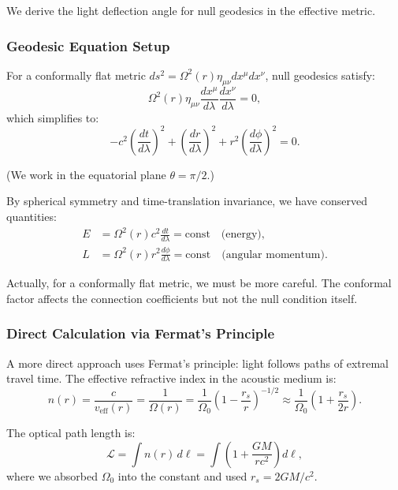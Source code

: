 \documentclass[11pt,a4paper]{article}
\theoremstyle{definition}
\theoremstyle{remark}
\begin{document}
We derive the light deflection angle for null geodesics in the effective metric.

\subsubsection{Geodesic Equation Setup}

For a conformally flat metric $ds^2 = \Omega^2(r) \eta_{\mu\nu} dx^\mu dx^\nu$, null geodesics satisfy:
\begin{equation}
\Omega^2(r) \eta_{\mu\nu} \frac{dx^\mu}{d\lambda} \frac{dx^\nu}{d\lambda} = 0,
\end{equation}
which simplifies to:
\begin{equation}
-c^2 \left(\frac{dt}{d\lambda}\right)^2 + \left(\frac{dr}{d\lambda}\right)^2 + r^2 \left(\frac{d\phi}{d\lambda}\right)^2 = 0.
\end{equation}

(We work in the equatorial plane $\theta = \pi/2$.)

By spherical symmetry and time-translation invariance, we have conserved quantities:
\begin{align}
E &= \Omega^2(r) c^2 \frac{dt}{d\lambda} = \text{const} \quad \text{(energy)}, \\
L &= \Omega^2(r) r^2 \frac{d\phi}{d\lambda} = \text{const} \quad \text{(angular momentum)}.
\end{align}

Actually, for a conformally flat metric, we must be more careful. The conformal factor affects the connection coefficients but not the null condition itself.

\subsubsection{Direct Calculation via Fermat's Principle}

A more direct approach uses Fermat's principle: light follows paths of extremal travel time. The effective refractive index in the acoustic medium is:
\begin{equation}
n(r) = \frac{c}{v_{\mathrm{eff}}(r)} = \frac{1}{\Omega(r)} = \frac{1}{\Omega_0}\left(1 - \frac{r_s}{r}\right)^{-1/2} \approx \frac{1}{\Omega_0}\left(1 + \frac{r_s}{2r}\right).
\end{equation}

The optical path length is:
\begin{equation}
\mathcal{L} = \int n(r) \, d\ell = \int \left(1 + \frac{GM}{rc^2}\right) d\ell,
\end{equation}
where we absorbed $\Omega_0$ into the constant and used $r_s = 2GM/c^2$.
\end{document}
